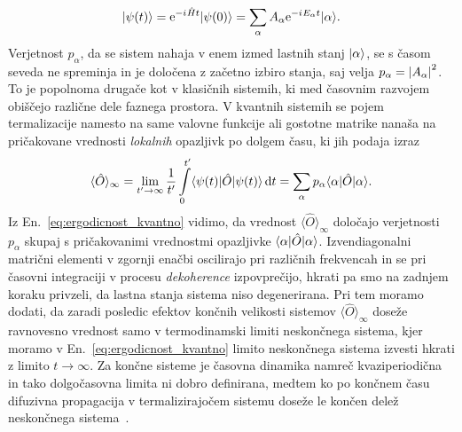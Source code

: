 \documentclass[10pt,a4paper]{article}
\newcommand{\iu}{{i\mkern1mu}}
\begin{document}
$$
\ket{\psi(t)}=\mathrm{e}^{-\iu \hat{H} t}\ket{\psi(0)}=\sum\limits_\alpha A_\alpha \mathrm{e}^{-\iu E_\alpha t}\ket{\alpha}.
$$
Verjetnost $p_\alpha$, da se sistem nahaja v enem izmed lastnih stanj $\vert\alpha\rangle$, se s časom seveda ne spreminja in je določena z začetno izbiro stanja, saj velja $p_\alpha=\left| A_\alpha \right|^2$. To je popolnoma drugače kot v klasičnih sistemih, ki med časovnim razvojem obiščejo različne dele faznega prostora. V kvantnih sistemih se pojem termalizacije namesto na same valovne funkcije	ali gostotne matrike nanaša na pričakovane vrednosti \emph{lokalnih} opazljivk po dolgem času, ki jih podaja izraz~\cite{deutsch1991quantum}~\cite{abanin2018ergodicity}
\begin{equation}\label{eq:ergodicnost_kvantno}
\langle \hat{O}\rangle_\infty=\lim_{t'\to\infty}\frac{1}{t'}\int\limits_0^{t'} \langle \psi(t) \vert\hat{O}\vert\psi(t)\rangle\,\mathrm{d} t = \sum\limits_\alpha p_\alpha\langle \alpha \vert\hat{O}\vert\alpha\rangle.
\end{equation}
Iz En.~\eqref{eq:ergodicnost_kvantno} vidimo, da vrednost $\langle \hat{O}\rangle_\infty$ določajo verjetnosti $p_\alpha$ skupaj s pričakovanimi vrednostmi opazljivke $\langle \alpha \vert\hat{O}\vert\alpha\rangle$. Izvendiagonalni matrični elementi v zgornji enačbi oscilirajo pri različnih frekvencah in se pri časovni integraciji v procesu \emph{dekoherence} izpovprečijo, hkrati pa smo na zadnjem koraku privzeli, da lastna stanja sistema niso degenerirana.	
Pri tem moramo dodati, da zaradi posledic efektov končnih velikosti sistemov $\langle\hat{O}\rangle_\infty$ doseže ravnovesno vrednost samo v termodinamski limiti neskončnega sistema, kjer moramo v En.~\eqref{eq:ergodicnost_kvantno} limito neskončnega sistema izvesti hkrati z limito $t\to\infty.$  Za končne sisteme je časovna dinamika namreč kvaziperiodična in tako dolgočasovna limita ni dobro definirana, medtem ko po končnem času difuzivna propagacija v termalizirajočem sistemu doseže le končen delež neskončnega sistema~\cite{PhysRevB.75.155111}. 
\end{document}
